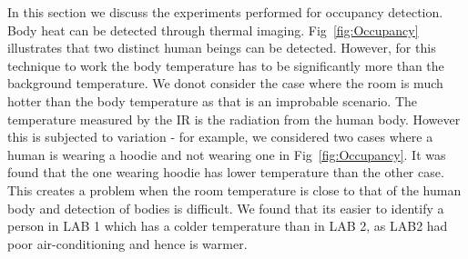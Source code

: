      In this section we discuss the experiments performed for occupancy detection. Body heat can be detected through thermal imaging. Fig~\ref{fig:Occupancy} illustrates that two distinct human beings can be detected. However, for this technique to work the body temperature has to be significantly more than the background temperature. We donot consider the case where the room is much hotter than the body temperature as that is an improbable scenario. The temperature measured by the IR is the radiation from the human body. However this is subjected to variation - for example, we considered two cases where a human is wearing a hoodie and not wearing one in Fig~\ref{fig:Occupancy}. It was found that the one wearing hoodie has lower temperature than the other case. This creates a problem when the room temperature is close to that of the human body and detection of bodies is difficult. We found that its easier to identify a person in LAB 1 which has a colder temperature than in LAB 2, as LAB2 had poor air-conditioning and hence is warmer. 




 